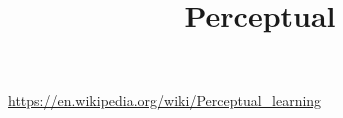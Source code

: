 \documentclass[a4paper]{article}
\title{Perceptual}
\date{}
\begin{document}
    \maketitle

    \url{https://en.wikipedia.org/wiki/Perceptual_learning}
\end{document}
